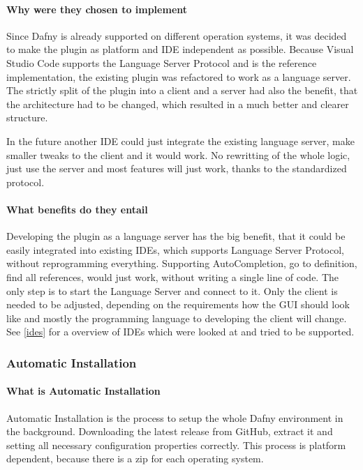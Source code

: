 \paragraph{Why were they chosen to implement}
Since Dafny is already supported on different operation systems, it was decided to make the plugin as platform and IDE independent as possible. Because Visual Studio Code supports the Language Server Protocol and is the reference implementation, the existing plugin was refactored to work as a language server. The strictly split of the plugin into a client and a server had also the benefit, that the architecture had to be changed, which resulted in a much better and clearer structure. \newline

In the future another IDE could just integrate the existing language server, make smaller tweaks to the client and it would work. No rewritting of the whole logic, just use the server and most features will just work, thanks to the standardized protocol. 

\paragraph{What benefits do they entail}
Developing the plugin as a language server has the big benefit, that it could be easily integrated into existing IDEs, which supports Language Server Protocol, without reprogramming everything. Supporting AutoCompletion, go to definition, find all references, would just work, without writing a single line of code. The only step is to start the Language Server and connect to it. Only the client is needed to be adjusted, depending on the requirements how the GUI should look like and mostly the programming language to developing the client will change. 
See \ref{ides} for a overview of IDEs which were looked at and tried to be supported. 


\subsubsection{Automatic Installation} \label{setupAutomaticInstallation}

\paragraph{What is Automatic Installation}
Automatic Installation is the process to setup the whole Dafny environment in the background. Downloading the latest release from GitHub, extract it and setting all necessary configuration properties correctly. This process is platform dependent, because there is a zip for each operating system. 


